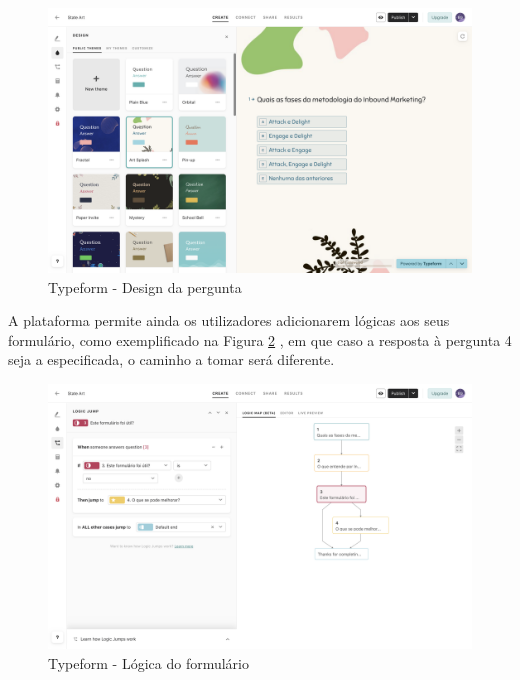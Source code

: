 \begin{figure}[ht!]
	\begin{center}
		\includegraphics[width=1\textwidth]{img/tf/tf-question-custom}
		\caption{Typeform - Design da pergunta}
		\label{fig:tf-question-custom}
	\end{center}
\end{figure}
 
 A plataforma permite ainda os utilizadores adicionarem lógicas aos seus formulário, como exemplificado na Figura \ref{fig:tf-question-logica} , em que caso a resposta à pergunta 4 seja a especificada, o caminho a tomar será diferente. 
 

 
 \begin{figure}[ht!]
 	\begin{center}
 		\includegraphics[width=1\textwidth]{img/tf/tf-question-logica}
 		\caption{Typeform - Lógica do formulário}
 		\label{fig:tf-question-logica}
 	\end{center}
 \end{figure}

